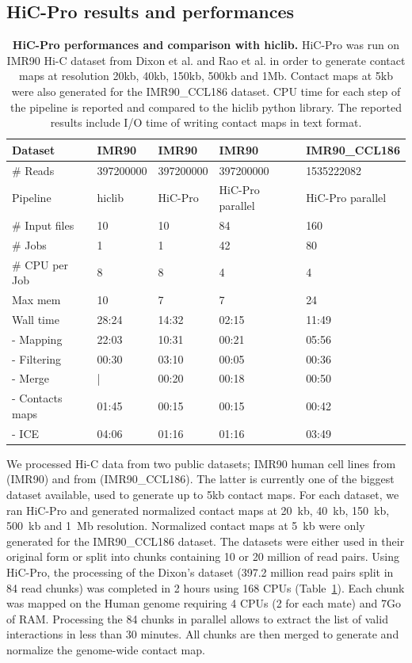 \subsection{HiC-Pro results and performances}

\begin{table}
\begin{tabular}{llll|l}
\hline
Dataset & IMR90 & IMR90 & IMR90 & IMR90\_CCL186 \\
\hline
\# Reads & 397200000 & 397200000 & 397200000 & 1535222082 \\
Pipeline & hiclib & HiC-Pro & HiC-Pro parallel & HiC-Pro parallel \\
\# Input files & 10 & 10 & 84 & 160 \\
\# Jobs & 1 & 1 & 42 & 80 \\
\# CPU per Job & 8 & 8 & 4 & 4 \\
Max mem & 10 & 7 & 7 & 24 \\
Wall time & 28:24 & 14:32 & 02:15 & 11:49 \\
- Mapping & 22:03 & 10:31 & 00:21 & 05:56 \\
- Filtering & 00:30 & 03:10 & 00:05 & 00:36 \\
- Merge & | & 00:20 & 00:18 & 00:50 \\
- Contacts maps & 01:45 & 00:15 & 00:15 & 00:42 \\
- ICE & 04:06 & 01:16 & 01:16 & 03:49 \\
\end{tabular}
\caption{\textbf{HiC-Pro performances and comparison with hiclib.} HiC-Pro was
run on IMR90 Hi-C dataset from Dixon et al. and Rao et al. in order to
generate contact maps at resolution 20kb, 40kb, 150kb, 500kb and 1Mb. Contact
maps at 5kb were also generated for the IMR90\_CCL186 dataset. CPU time for
each step of the pipeline is reported and compared to the hiclib python
library. The reported results include I/O time of writing contact maps in text
format.}
\label{table:table3}
\end{table}


We processed Hi-C data from two public datasets; IMR90 human cell lines from
\citep{dixon:topological} (IMR90) and from \citep{rao:3d} (IMR90\_CCL186). The
latter is currently one of the biggest dataset available, used to generate up
to 5kb contact maps. For each dataset, we ran HiC-Pro and generated normalized
contact maps at 20~kb, 40~kb, 150~kb, 500~kb and 1~Mb resolution. Normalized
contact maps at 5~kb were only generated for the IMR90\_CCL186 dataset. The
datasets were either used in their original form or split into chunks
containing 10 or 20 million of read pairs. Using HiC-Pro, the processing of
the Dixon’s dataset (397.2 million read pairs split in 84 read chunks) was
completed in 2 hours using 168 CPUs (Table~\ref{table:table3}). Each chunk was
mapped on the Human genome requiring 4 CPUs (2 for each mate) and 7Go of RAM.
Processing the 84 chunks in parallel allows to extract the list of valid
interactions in less than 30 minutes. All chunks are then merged to generate
and normalize the genome-wide contact map.

